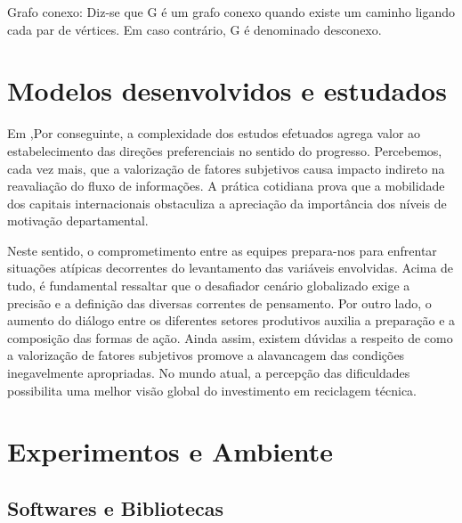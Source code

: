 \documentclass{endm}
\begin{document}
    Grafo conexo: Diz-se que G é um grafo conexo quando existe um caminho ligando cada par de vértices. Em caso contrário, G é denominado desconexo.


\section{Modelos desenvolvidos e estudados}\label{sec:smallWorldModel}

Em \cite{fan2006},Por conseguinte, a complexidade dos estudos efetuados agrega valor ao estabelecimento das direções preferenciais no sentido do progresso. Percebemos, cada vez mais, que a valorização de fatores subjetivos causa impacto indireto na reavaliação do fluxo de informações. A prática cotidiana prova que a mobilidade dos capitais internacionais obstaculiza a apreciação da importância dos níveis de motivação departamental.

          Neste sentido, o comprometimento entre as equipes prepara-nos para enfrentar situações atípicas decorrentes do levantamento das variáveis envolvidas. Acima de tudo, é fundamental ressaltar que o desafiador cenário globalizado exige a precisão e a definição das diversas correntes de pensamento. Por outro lado, o aumento do diálogo entre os diferentes setores produtivos auxilia a preparação e a composição das formas de ação. Ainda assim, existem dúvidas a respeito de como a valorização de fatores subjetivos promove a alavancagem das condições inegavelmente apropriadas. No mundo atual, a percepção das dificuldades possibilita uma melhor visão global do investimento em reciclagem técnica.






\section{Experimentos e Ambiente}\label{sec:OurExperiments}

\subsection{Softwares e Bibliotecas}
\end{document}
